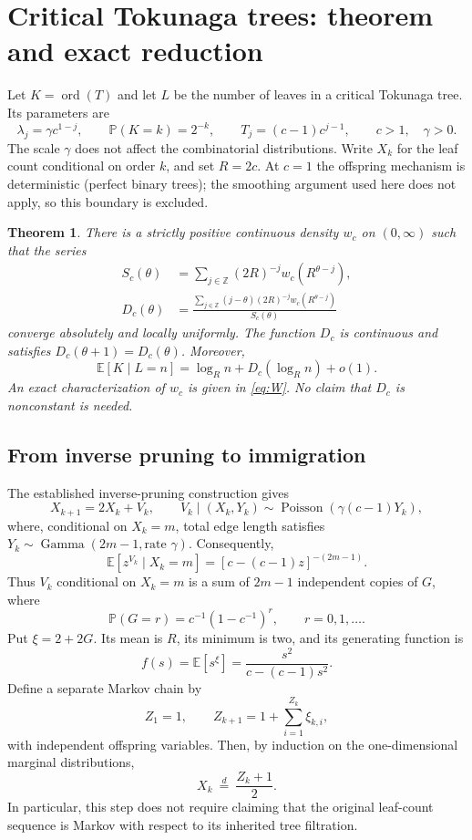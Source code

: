 \documentclass[11pt,a4paper]{article}
\newtheorem{theorem}{Theorem}[section]
\theoremstyle{remark}\newtheorem{remark}[theorem]{Remark}
\newcommand{\E}{\mathbb E}\newcommand{\Pp}{\mathbb P}
\DeclareMathOperator{\ord}{ord}
\begin{document}
\section{Critical Tokunaga trees: theorem and exact reduction}
Let $K=\ord(T)$ and let $L$ be the number of leaves in a critical Tokunaga tree. Its parameters are
\[
\lambda_j=\gamma c^{1-j},\qquad \Pp(K=k)=2^{-k},\qquad
T_j=(c-1)c^{j-1},\qquad c>1,\quad\gamma>0.
\]
The scale $\gamma$ does not affect the combinatorial distributions. Write $X_k$ for the leaf count conditional on order $k$, and set $R=2c$.
At $c=1$ the offspring mechanism is deterministic (perfect binary trees); the smoothing argument used here does not apply, so this boundary is excluded.

\begin{theorem}\label{thm:toku}
There is a strictly positive continuous density $w_c$ on $(0,\infty)$ such that the series
\begin{align}
 S_c(\theta)&=\sum_{j\in\mathbb Z}(2R)^{-j}w_c(R^{\theta-j}),\label{eq:S}\\
 D_c(\theta)&=\frac{\displaystyle\sum_{j\in\mathbb Z}(j-\theta)(2R)^{-j}w_c(R^{\theta-j})}{S_c(\theta)}\label{eq:D}
\end{align}
converge absolutely and locally uniformly. The function $D_c$ is continuous and satisfies $D_c(\theta+1)=D_c(\theta)$. Moreover,
\[
\boxed{\E[K\mid L=n]=\log_R n+D_c(\log_R n)+o(1).}
\]
An exact characterization of $w_c$ is given in \eqref{eq:W}. No claim that $D_c$ is nonconstant is needed.
\end{theorem}

\subsection{From inverse pruning to immigration}
The established inverse-pruning construction gives
\[
X_{k+1}=2X_k+V_k,\qquad
V_k\mid(X_k,Y_k)\sim\operatorname{Poisson}(\gamma(c-1)Y_k),
\]
where, conditional on $X_k=m$, total edge length satisfies
$Y_k\sim\operatorname{Gamma}(2m-1,\text{rate }\gamma)$.
Consequently,
\begin{equation}\label{eq:NB}
\E[z^{V_k}\mid X_k=m]=[c-(c-1)z]^{-(2m-1)}.
\end{equation}
Thus $V_k$ conditional on $X_k=m$ is a sum of $2m-1$ independent copies of $G$, where
\[
\Pp(G=r)=c^{-1}(1-c^{-1})^r,\qquad r=0,1,\ldots.
\]
Put $\xi=2+2G$. Its mean is $R$, its minimum is two, and its generating function is
\begin{equation}\label{eq:f}
f(s)=\E[s^\xi]=\frac{s^2}{c-(c-1)s^2}.
\end{equation}
Define a separate Markov chain by
\begin{equation}\label{eq:immigration}
Z_1=1,\qquad Z_{k+1}=1+\sum_{i=1}^{Z_k}\xi_{k,i},
\end{equation}
with independent offspring variables. Then, by induction on the one-dimensional marginal distributions,
\begin{equation}\label{eq:match}
X_k\ \stackrel d=\ \frac{Z_k+1}{2}.
\end{equation}
In particular, this step does not require claiming that the original leaf-count sequence is Markov with respect to its inherited tree filtration.
\end{document}
